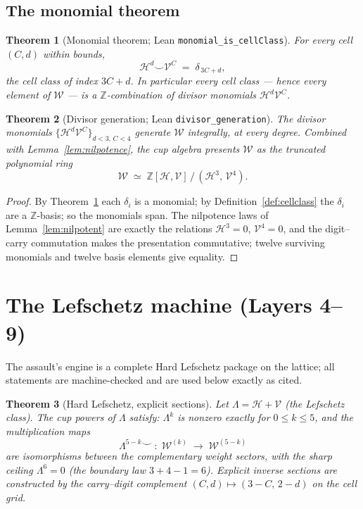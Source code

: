 \documentclass[11pt,a4paper]{article}
\theoremstyle{plain}
\newtheorem{theorem}{Theorem}[section]
\theoremstyle{definition}
\newcommand{\Z}{\mathbb{Z}}
\newcommand{\HC}{\mathcal{H}}
\newcommand{\VV}{\mathcal{V}}
\newcommand{\cupop}{\smile}
\begin{document}
\subsection{The monomial theorem}

\begin{theorem}[Monomial theorem; Lean \texttt{monomial\_is\_cellClass}]
\label{thm:monomial}
For every cell $(C,d)$ within bounds,
\[
  \HC^{d} \cupop \VV^{C} \;=\; \delta_{\,3C+d},
\]
the cell class of index $3C + d$. In particular every cell class --- hence
every element of $\mathcal{W}$ --- is a $\Z$-combination of divisor monomials
$\HC^{d}\VV^{C}$.
\end{theorem}

\begin{theorem}[Divisor generation; Lean \texttt{divisor\_generation}]
\label{thm:divgen}
The divisor monomials $\{\HC^{d}\VV^{C}\}_{d<3,\,C<4}$ generate $\mathcal{W}$
integrally, at every degree. Combined with
Lemma~\ref{lem:nilpotence}, the cup algebra presents $\mathcal{W}$ as the
truncated polynomial ring
\[
  \mathcal{W} \;\simeq\; \Z[\HC,\VV]\,\big/\,(\HC^{3},\,\VV^{4}).
\]
\end{theorem}

\begin{proof}
By Theorem~\ref{thm:monomial} each $\delta_i$ is a monomial; by
Definition~\ref{def:cellclass} the $\delta_i$ are a $\Z$-basis; so the
monomials span. The nilpotence laws of Lemma~\ref{lem:nilpotent} are exactly
the relations $\HC^{3}=0$, $\VV^{4}=0$, and the digit--carry commutation
makes the presentation commutative; twelve surviving monomials and twelve
basis elements give equality. \end{proof}

\section{The Lefschetz machine (Layers 4--9)}\label{sec:lefschetz}

The assault's engine is a complete Hard Lefschetz package on the lattice;
all statements are machine-checked and are used below exactly as cited.

\begin{theorem}[Hard Lefschetz, explicit sections]\label{thm:hl}
Let $\Lambda = \HC + \VV$ (the Lefschetz class). The cup powers of $\Lambda$
satisfy: $\Lambda^{k}$ is nonzero exactly for $0 \le k \le 5$, and the
multiplication maps
\[
  \Lambda^{5-k} \cupop \;:\; \mathcal{W}^{(k)} \;\longrightarrow\;
  \mathcal{W}^{(5-k)}
\]
are isomorphisms between the complementary weight sectors, with the sharp
ceiling $\Lambda^{6} = 0$ (the boundary law $3+4-1 = 6$). Explicit inverse
sections are constructed by the carry--digit complement
$(C,d) \mapsto (3-C,\,2-d)$ on the cell grid.
\end{theorem}
\end{document}
